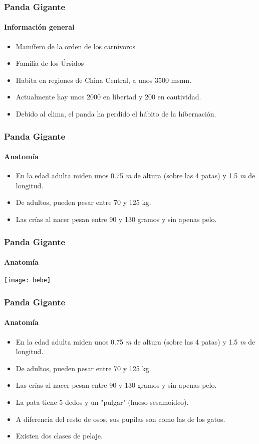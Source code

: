 \documentclass[10pt,a4paper]{beamer}
\theoremstyle{definition}
\theoremstyle{remark}
\begin{document}
\begin{frame}
\frametitle{Panda Gigante}
\framesubtitle{Información general}
\begin{itemize}
\item Mamífero de la orden de los carnívoros
\item Familia de los Úrsidos
\item Habita en regiones de China Central, a unos 3500 msnm.
\item Actualmente hay unos 2000 en libertad y 200 en cautividad.
\item Debido al clima, el panda ha perdido el hábito de la hibernación.
\end{itemize}
\end{frame}

\begin{frame}
\frametitle{Panda Gigante}
\framesubtitle{Anatomía}
\begin{itemize}
\item En la edad adulta miden unos 0.75 \textit{m} de altura (sobre las 4 patas) y 1.5 \textit{m} de longitud.
\item De adultos, pueden pesar entre 70 y 125 kg.
\item Las crías al nacer pesan entre 90 y 130 gramos y sin apenas pelo.
\end{itemize}
\end{frame}

\begin{frame}
\frametitle{Panda Gigante}
\framesubtitle{Anatomía}
\texttt{[image: bebe]}
\end{frame}

\begin{frame}
\frametitle{Panda Gigante}
\framesubtitle{Anatomía}
\begin{itemize}
\item En la edad adulta miden unos 0.75 \textit{m} de altura (sobre las 4 patas) y 1.5 \textit{m} de longitud.
\item De adultos, pueden pesar entre 70 y 125 kg.
\item Las crías al nacer pesan entre 90 y 130 gramos y sin apenas pelo.
\item La pata tiene 5 dedos y un "pulgar" (hueso sesamoideo).
\item A diferencia del resto de osos, sus pupilas son como las de los gatos.
\item Existen dos clases de pelaje.
\end{itemize}
\end{frame}
\end{document}
